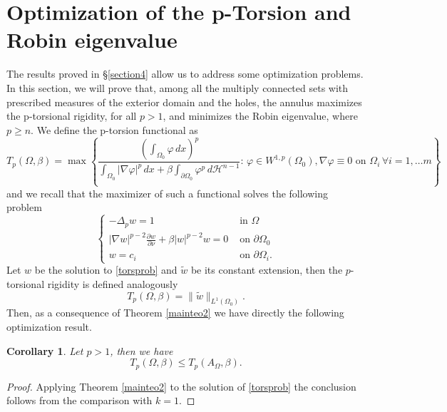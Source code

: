 \documentclass[12pt]{article}
\newcommand{\abs}[1]{{\left|#1\right|}}
\newcommand{\dH}{d\mathcal{H}^{n-1}}
\theoremstyle{definition}
\theoremstyle{plain}
\newtheorem{corollario}[teorema]{Corollary}
\theoremstyle{definition}
\begin{document}
\section{Optimization of the p-Torsion and Robin eigenvalue}\label{section5}
The results proved in \S\ref{section4} allow us to address some optimization problems. In this section, we will prove that, among all the multiply connected sets with prescribed measures of the exterior domain and the holes, the annulus maximizes the p-torsional rigidity, for all $p>1$, and minimizes the Robin eigenvalue, where $p\geq n$.
We define the p-torsion functional as
\begin{equation*}
    T_p(\Omega,\beta)=\max\left\{\frac{\left(\int_{\Omega_0}\varphi\,dx\right)^p}{\int_{\Omega_0}\abs{\nabla\varphi}^p\,dx+\beta\int_{\partial\Omega_0}\varphi^p\,\dH}:\, \varphi \in W^{1,p}(\Omega_0), \nabla\varphi\equiv0 \text{ on }  \Omega_i \, \forall i=1, \dots m\right\}
\end{equation*}
and we recall that the maximizer of such a functional solves the following problem
\begin{equation}\label{torsprob}
    \begin{cases}
        -\Delta_p w=1 & \text{ in }\Omega\\
        \abs{\nabla w}^{p-2}\frac{\partial w}{\partial \nu}+\beta\abs{w}^{p-2}w=0 & \text{ on }\partial\Omega_0\\
        w=c_i & \text{ on }\partial\Omega_i.
    \end{cases}
\end{equation}
Let $w$ be the solution to \eqref{torsprob} and $\tilde w$ be its constant extension, then the $p$-torsional rigidity is defined analogously
\begin{equation*}
    T_p(\Omega,\beta)=\|\tilde w\|_{L^1(\Omega_0)}.
\end{equation*}
Then, as a consequence of Theorem \ref{mainteo2} we have directly the following optimization result.
\begin{corollario}
    Let $p>1$, then we have
    \begin{equation*}
        T_p(\Omega,\beta)\leq T_p(A_\Omega,\beta).
    \end{equation*}
\end{corollario}
\begin{proof}
    Applying Theorem \ref{mainteo2} to the solution of \eqref{torsprob} the conclusion follows from the comparison with $k=1$. 
\end{proof}
\end{document}
